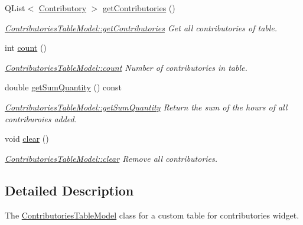 \begin{DoxyCompactItemize}
Q\-List$<$ \hyperlink{classModels_1_1Contributory}{Contributory} $>$ \hyperlink{classGui_1_1Widgets_1_1WdgModels_1_1ContributoriesTableModel_af20bc21f24f7597b6b7d053d11d02d97}{get\-Contributories} ()
\begin{DoxyCompactList}\small\item\em \hyperlink{classGui_1_1Widgets_1_1WdgModels_1_1ContributoriesTableModel_af20bc21f24f7597b6b7d053d11d02d97}{Contributories\-Table\-Model\-::get\-Contributories} Get all contributories of table. \end{DoxyCompactList}\item 
int \hyperlink{classGui_1_1Widgets_1_1WdgModels_1_1ContributoriesTableModel_acc01a97c00bb57e6733f697fc45be0ed}{count} ()
\begin{DoxyCompactList}\small\item\em \hyperlink{classGui_1_1Widgets_1_1WdgModels_1_1ContributoriesTableModel_acc01a97c00bb57e6733f697fc45be0ed}{Contributories\-Table\-Model\-::count} Number of contributories in table. \end{DoxyCompactList}\item 
double \hyperlink{classGui_1_1Widgets_1_1WdgModels_1_1ContributoriesTableModel_ac62bb6714ddcccb0ed2bfb2babb4c075}{get\-Sum\-Quantity} () const 
\begin{DoxyCompactList}\small\item\em \hyperlink{classGui_1_1Widgets_1_1WdgModels_1_1ContributoriesTableModel_ac62bb6714ddcccb0ed2bfb2babb4c075}{Contributories\-Table\-Model\-::get\-Sum\-Quantity} Return the sum of the hours of all contriburoies added. \end{DoxyCompactList}\item 
\hypertarget{classGui_1_1Widgets_1_1WdgModels_1_1ContributoriesTableModel_aa7854991b9d25db6c3eb55b638f81d6d}{void \hyperlink{classGui_1_1Widgets_1_1WdgModels_1_1ContributoriesTableModel_aa7854991b9d25db6c3eb55b638f81d6d}{clear} ()}\label{classGui_1_1Widgets_1_1WdgModels_1_1ContributoriesTableModel_aa7854991b9d25db6c3eb55b638f81d6d}

\begin{DoxyCompactList}\small\item\em \hyperlink{classGui_1_1Widgets_1_1WdgModels_1_1ContributoriesTableModel_aa7854991b9d25db6c3eb55b638f81d6d}{Contributories\-Table\-Model\-::clear} Remove all contributories. \end{DoxyCompactList}\end{DoxyCompactItemize}


\subsection{Detailed Description}
The \hyperlink{classGui_1_1Widgets_1_1WdgModels_1_1ContributoriesTableModel}{Contributories\-Table\-Model} class for a custom table for contributories widget. 

